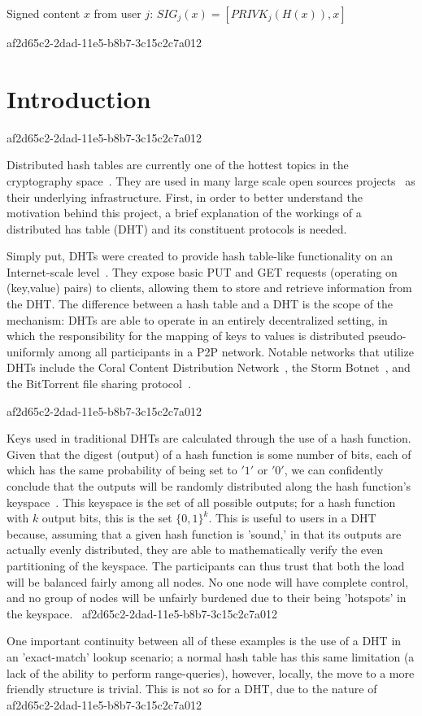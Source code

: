 \documentclass[12pt]{article}
\begin{document}
Signed content $x$ from user $j$: $SIG_j(x) = \left[ PRIVK_j( H(x) ), x \right]$

af2d65c2-2dad-11e5-b8b7-3c15c2c7a012\section{Introduction}
af2d65c2-2dad-11e5-b8b7-3c15c2c7a012\par Distributed hash tables are currently one of the hottest topics in the cryptography space~\cite{Stoica:2001dj,Rowstron:2001ea,Ratnasamy:2001wn}. They are used in many large scale open sources projects~\cite{Freitas:2013tb,Xu:2010vs,Perfitt:2010fh} as their underlying infrastructure. First, in order to better understand the motivation behind this project, a brief explanation of the workings of a distributed has table (DHT) and its constituent protocols is needed.

\par Simply put, DHTs were created to provide hash table-like functionality on an Internet-scale level~\cite{Ratnasamy:2001wn}. They expose basic PUT and GET requests (operating on (key,value) pairs) to clients, allowing them to store and retrieve information from the DHT. The difference between a hash table and a DHT is the scope of the mechanism: DHTs are able to operate in an entirely decentralized setting, in which the responsibility for the mapping of keys to values is distributed pseudo-uniformly among all participants in a P2P network. Notable networks that utilize DHTs include the Coral Content Distribution Network~\cite{Freedman:2004vb}, the Storm Botnet~\cite{Holz:2008uk}, and the BitTorrent file sharing protocol~\cite{Cohen:y1_8mBnw}.

af2d65c2-2dad-11e5-b8b7-3c15c2c7a012\par Keys used in traditional DHTs are calculated through the use of a hash function. Given that the digest (output) of a hash function is some number of bits, each of which has the same probability of being set to $'1'$ or $'0'$, we can confidently conclude that the outputs will be randomly distributed along the hash function's keyspace~. This keyspace is the set of all possible outputs; for a hash function with $k$ output bits, this is the set $\{0,1\}^k$. This is useful to users in a DHT because, assuming that a given hash function is 'sound,' in that its outputs are actually evenly distributed, they are able to mathematically verify the even partitioning of the keyspace. The participants can thus trust that both the load will be balanced fairly among all nodes. No one node will have complete control, and no group of nodes will be unfairly burdened due to their being 'hotspots' in the keyspace.~
af2d65c2-2dad-11e5-b8b7-3c15c2c7a012
\par One important continuity between all of these examples is the use of a DHT in an 'exact-match' lookup scenario; a normal hash table has this same limitation (a lack of the ability to perform range-queries), however, locally, the move to a more friendly structure is trivial. This is not so for a DHT, due to the nature of
\printbibliography
af2d65c2-2dad-11e5-b8b7-3c15c2c7a012
\end{document}
